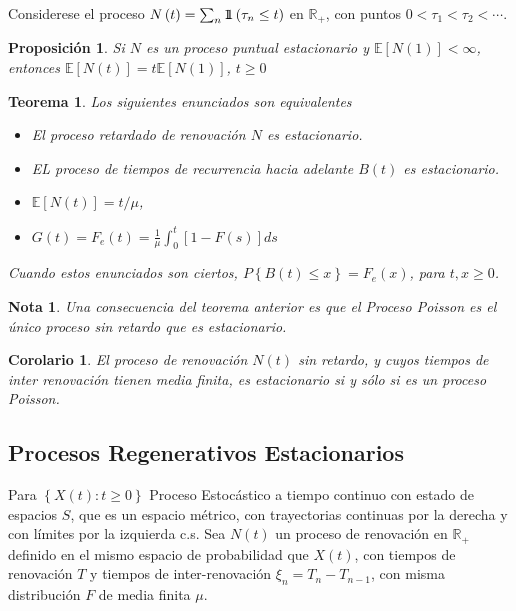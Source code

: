 \documentclass{article}
\newtheorem{Teo}{Teorema}[section]
\newtheorem{Note}{Nota}[section]
\newtheorem{Prop}{Proposición}[section]
\newtheorem{Cor}{Corolario}[section]
\newcommand{\rea}{\mathbb{R}}
\newcommand{\esp}{\mathbb{E}}
\newcommand{\indora}{\mbox{$1$\hspace{-0.8ex}$1$}}
\numberwithin{equation}{section}
\begin{document}
Considerese el proceso $N\left(t\right)=\sum_{n}\indora\left(\tau_{n}\leq t\right)$ en $\rea_{+}$, con puntos $0<\tau_{1}<\tau_{2}<\cdots$.

\begin{Prop}
Si $N$ es un proceso puntual estacionario y $\esp\left[N\left(1\right)\right]<\infty$, entonces $\esp\left[N\left(t\right)\right]=t\esp\left[N\left(1\right)\right]$, $t\geq0$
\end{Prop}

\begin{Teo}
Los siguientes enunciados son equivalentes
\begin{itemize}
\item[i)] El proceso retardado de renovaci\'on $N$ es estacionario.
\item[ii)] EL proceso de tiempos de recurrencia hacia adelante $B\left(t\right)$ es estacionario.
\item[iii)] $\esp\left[N\left(t\right)\right]=t/\mu$,
\item[iv)] $G\left(t\right)=F_{e}\left(t\right)=\frac{1}{\mu}\int_{0}^{t}\left[1-F\left(s\right)\right]ds$
\end{itemize}
Cuando estos enunciados son ciertos, $P\left\{B\left(t\right)\leq x\right\}=F_{e}\left(x\right)$, para $t,x\geq0$.
\end{Teo}

\begin{Note}
Una consecuencia del teorema anterior es que el Proceso Poisson es el \'unico proceso sin retardo que es estacionario.
\end{Note}

\begin{Cor}
El proceso de renovaci\'on $N\left(t\right)$ sin retardo, y cuyos tiempos de inter renovaci\'on tienen media finita, es estacionario si y s\'olo si es un proceso Poisson.
\end{Cor}

\subsection*{Procesos Regenerativos Estacionarios}

Para $\left\{X\left(t\right):t\geq0\right\}$ Proceso Estoc\'astico a tiempo continuo con estado de espacios $S$, que es un espacio m\'etrico, con trayectorias continuas por la derecha y con l\'imites por la izquierda c.s. Sea $N\left(t\right)$ un proceso de renovaci\'on en $\rea_{+}$ definido en el mismo espacio de probabilidad que $X\left(t\right)$, con tiempos de renovaci\'on $T$ y tiempos de inter-renovaci\'on $\xi_{n}=T_{n}-T_{n-1}$, con misma distribuci\'on $F$ de media finita $\mu$.
\end{document}
